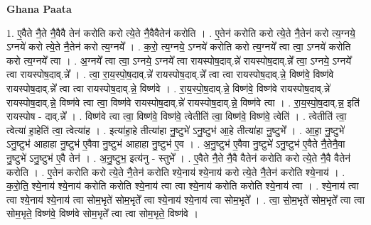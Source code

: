 \documentclass[17pt]{extarticle}
\begin{document}
\textbf{Ghana Paata } \newline

1. ए॒वैते नै॒ते नै॒वैवै तेन॑ करोति करो त्ये॒ते नै॒वैवैतेन॑ करोति । . ए॒तेन॑ करोति करो त्ये॒ते नै॒तेन॑ करो त्य॒ग्नये॒ ऽग्नये॑ करो त्ये॒ते नै॒तेन॑ करो त्य॒ग्नये᳚ । . क॒रो॒ त्य॒ग्नये॒ ऽग्नये॑ करोति करो त्य॒ग्नये᳚ त्वा त्वा॒ ऽग्नये॑ करोति करो त्य॒ग्नये᳚ त्वा । . अ॒ग्नये᳚ त्वा त्वा॒ ऽग्नये॒ ऽग्नये᳚ त्वा रायस्पोष॒दाव्.न्ने॑ रायस्पोष॒दाव्.न्ने᳚ त्वा॒ ऽग्नये॒ ऽग्नये᳚ त्वा रायस्पोष॒दाव्.न्ने᳚ । . त्वा॒ रा॒य॒स्पो॒ष॒दाव्.न्ने॑ रायस्पोष॒दाव्.न्ने᳚ त्वा त्वा रायस्पोष॒दाव्.न्ने॒ विष्ण॑वे॒ विष्ण॑वे रायस्पोष॒दाव्.न्ने᳚ त्वा त्वा रायस्पोष॒दाव्.न्ने॒ विष्ण॑वे । . रा॒य॒स्पो॒ष॒दाव्.न्ने॒ विष्ण॑वे॒ विष्ण॑वे रायस्पोष॒दाव्.न्ने॑ रायस्पोष॒दाव्.न्ने॒ विष्ण॑वे त्वा त्वा॒ विष्ण॑वे रायस्पोष॒दाव्.न्ने॑ रायस्पोष॒दाव्.न्ने॒ विष्ण॑वे त्वा । . रा॒य॒स्पो॒ष॒दाव्.न्न॒ इति॑ रायस्पोष - दाव्.न्ने᳚ । . विष्ण॑वे त्वा त्वा॒ विष्ण॑वे॒ विष्ण॑वे॒ त्वेतीति॑ त्वा॒ विष्ण॑वे॒ विष्ण॑वे॒ त्वेति॑ । . त्वेतीति॑ त्वा॒ त्वेत्या॑ हा॒हेति॑ त्वा॒ त्वेत्या॑ह । . इत्या॑हा॒हे तीत्या॑हा नु॒ष्टुभे॑ ऽनु॒ष्टुभ॑ आ॒हे तीत्या॑हा नु॒ष्टुभे᳚ । . आ॒हा॒ नु॒ष्टुभे॑ ऽनु॒ष्टुभ॑ आहाहा नु॒ष्टुभ॑ ए॒वैवा नु॒ष्टुभ॑ आहाहा नु॒ष्टुभ॑ ए॒व । . अ॒नु॒ष्टुभ॑ ए॒वैवा नु॒ष्टुभे॑ ऽनु॒ष्टुभ॑ ए॒वैते नै॒तेनै॒वा नु॒ष्टुभे॑ ऽनु॒ष्टुभ॑ ए॒वै तेन॑ । . अ॒नु॒ष्टुभ॒ इत्य॑नु - स्तुभे᳚ । . ए॒वैते नै॒ते नै॒वै वैतेन॑ करोति करो त्ये॒ते नै॒वै वैतेन॑ करोति । . ए॒तेन॑ करोति करो त्ये॒ते नै॒तेन॑ करोति श्ये॒नाय॑ श्ये॒नाय॑ करो त्ये॒ते नै॒तेन॑ करोति श्ये॒नाय॑ । . क॒रो॒ति॒ श्ये॒नाय॑ श्ये॒नाय॑ करोति करोति श्ये॒नाय॑ त्वा त्वा श्ये॒नाय॑ करोति करोति श्ये॒नाय॑ त्वा । . श्ये॒नाय॑ त्वा त्वा श्ये॒नाय॑ श्ये॒नाय॑ त्वा सोम॒भृते॑ सोम॒भृते᳚ त्वा श्ये॒नाय॑ श्ये॒नाय॑ त्वा सोम॒भृते᳚ । . त्वा॒ सो॒म॒भृते॑ सोम॒भृते᳚ त्वा त्वा सोम॒भृते॒ विष्ण॑वे॒ विष्ण॑वे सोम॒भृते᳚ त्वा त्वा सोम॒भृते॒ विष्ण॑वे । \newline
\end{document}
